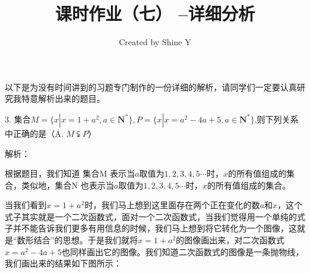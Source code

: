\documentclass{article}
\title{课时作业（七）  --详细分析}
\author{Created by Shine Y}
\begin{document}
\maketitle

以下是为没有时间讲到的习题专门制作的一份详细的解析，请同学们一定要认真研究我特意解析出来的题目。
\vspace{20pt}

3. 集合$M=\{x|x=1+a^2, a\in \mathbf{N}^*\}, P=\{x|x=a^2-4a+5, a\in \mathbf{N}^*\}$,则下列关系中正确的是（A.  $M\subsetneqq P$）

解析：

根据题目，我们知道 集合M 表示当$a$取值为$1,2,3,4,5 \cdots$时，$x$的所有值组成的集合，类似地，集合N 也表示当$a$取值为$1,2,3,4,5 \cdots$时，$x$的所有值组成的集合。

当我们看到$x=1+a^2$时，我们马上想到这里面存在两个正在变化的数$a$和$x$，这个式子其实就是一个二次函数式，面对一个二次函数式，当我们觉得用一个单纯的式子并不能告诉我们更多有用信息的时候，我们马上想到将它转化为一个图像，这就是“数形结合”的思想。于是我们就将$x=1+a^2$的图像画出来，对二次函数式$x=a^2-4a+5$也同样画出它的图像。我们知道二次函数式的图像是一条抛物线，我们画出来的结果如下图所示：
\end{document}
